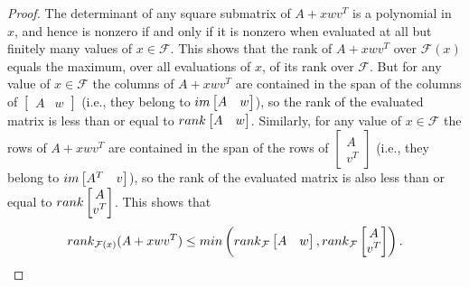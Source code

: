 \documentclass[10pt,a4paper]{amsart}
\begin{document}
\begin{proof}
The determinant of any square submatrix of $A + xwv^T$ is a polynomial in $x$, and hence is nonzero if and only if it is nonzero when evaluated at all but finitely many values of $x \in \mathcal{F}$. This shows that the rank of $A + xwv^T$ over $\mathcal{F}(x)$ equals the maximum, over all evaluations of $x$, of its rank over $\mathcal{F}$. But for any value of $x \in \mathcal{F}$ the columns of $A + xwv^T$ are contained in the span of the columns of $\left[\begin{matrix} A&w\end{matrix}\right]$ (i.e., they belong to ${\rm im}\left[\begin{matrix} A&w\end{matrix}\right]$), so the rank of the evaluated matrix is less than or equal to ${\rm rank}\left[\begin{matrix} A&w\end{matrix}\right]$. Similarly, for any value of $x \in \mathcal{F}$ the rows of $A + xwv^T$ are contained in the span of the rows of $\left[\begin{matrix} A\\v^T\end{matrix}\right]$ (i.e., they belong to ${\rm im} \left[\begin{matrix} A^T & v\end{matrix}\right]$), so the rank of the evaluated matrix is also less than or equal to ${\rm rank}\left[\begin{matrix} A\\ v^T\end{matrix}\right]$. This shows that $${\rm rank}_{\mathcal{F}(x)}(A + xwv^T) \leq {\rm min}\left({\rm rank}_\mathcal{F}\left[\begin{matrix} A&w\end{matrix}\right], {\rm rank}_{\mathcal{F}}\left[\begin{matrix} A\\ v^T\end{matrix}\right]\right).$$


\end{proof}
\end{document}
